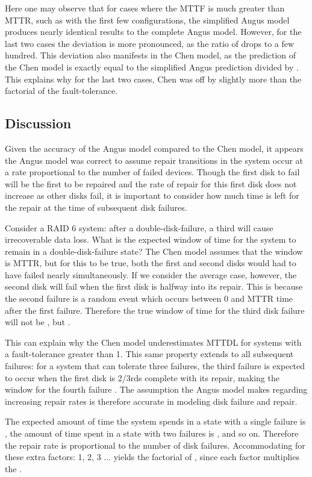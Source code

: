 \documentclass[XXX,endnotes]{usetex-v1}
\begin{document}
Here one may observe that for cases where the MTTF is much greater than MTTR, such as with the first few configurations, the simplified Angus model produces nearly identical results to the complete Angus model.  However, for the last two cases the deviation is more pronounced, as the ratio of  drops to a few hundred.  This deviation also manifests in the Chen model, as the prediction of the Chen model is exactly equal to the simplified Angus prediction divided by .  This explains why for the last two cases, Chen was off by slightly more than the factorial of the fault-tolerance.

\subsection{Discussion}

Given the accuracy of the Angus model compared to the Chen model, it appears the Angus model was correct to assume repair transitions in the system occur at a rate proportional to the number of failed devices.  Though the first disk to fail will be the first to be repaired and the rate of repair for this first disk does not increase as other disks fail, it is important to consider how much time is left for the repair at the time of subsequent disk failures.

Consider a RAID 6 system: after a double-disk-failure, a third will cause irrecoverable data loss.  What is the expected window of time for the system to remain in a double-disk-failure state?  The Chen model assumes that the window is MTTR, but for this to be true, both the first and second disks would had to have failed nearly simultaneously.  If we consider the average case, however, the second disk will fail when the first disk is halfway into its repair.  This is because the second failure is a random event which occurs between 0 and MTTR time after the first failure.  Therefore the true window of time for the third disk failure will not be , but .

This can explain why the Chen model underestimates MTTDL for systems with a fault-tolerance greater than 1.  This same property extends to all subsequent failures: for a system that can tolerate three failures, the third failure is expected to occur when the first disk is 2/3rds complete with its repair, making the window for the fourth failure .  The assumption the Angus model makes regarding increasing repair rates is therefore accurate in modeling disk failure and repair.

The expected amount of time the system spends in a state with a single failure is , the amount of time spent in a state with two failures is , and so on.  Therefore the repair rate is proportional to the number of disk failures.  Accommodating for these extra factors: 1, 2, 3 ...  yields the factorial of , since each factor multiplies the .
\end{document}
